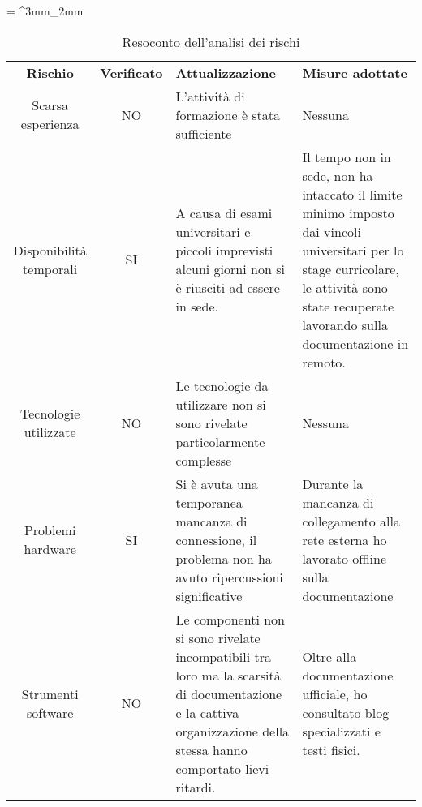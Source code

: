 \tabulinesep = ^3mm_2mm
\begin{longtabu} to \textwidth {ccXX}
    \caption[Resoconto dell'analisi dei rischi]{Resoconto dell'analisi dei rischi}
    \label{tab:rischi-final}
    \endlastfoot
    \rowfont{\bfseries\sffamily\leavevmode\color{white}}
    \textbf{Rischio} & \textbf{Verificato} & \textbf{Attualizzazione} & \textbf{Misure adottate} \\
    Scarsa esperienza & NO & L'attività di formazione è stata sufficiente & Nessuna\\ %
    Disponibilità temporali & SI & A causa di esami universitari e piccoli imprevisti alcuni giorni non si è riusciti ad essere in sede. & Il tempo non in sede, non ha intaccato il limite minimo imposto dai vincoli universitari per lo stage curricolare, le attività sono state recuperate lavorando sulla documentazione in remoto. \\ %
    Tecnologie utilizzate & NO & Le tecnologie da utilizzare non si sono rivelate particolarmente complesse & Nessuna\\ %
    Problemi hardware & SI & Si è avuta una temporanea mancanza di connessione, il problema non ha avuto ripercussioni significative & Durante la mancanza di collegamento alla rete esterna ho lavorato offline sulla documentazione \\ %
    Strumenti software & NO & Le componenti non si sono rivelate incompatibili tra loro ma la scarsità di documentazione e la cattiva organizzazione della stessa hanno comportato lievi ritardi. & Oltre alla documentazione ufficiale, ho consultato blog specializzati e testi fisici.\\ %
\end{longtabu}